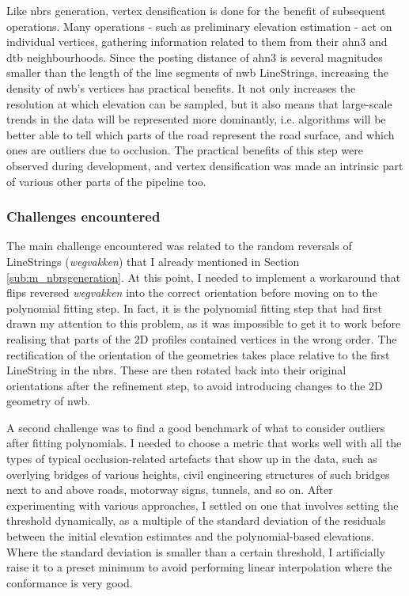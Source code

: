 Like \ac{nbrs} generation, vertex densification is done for the benefit of subsequent operations. Many operations - such as preliminary elevation estimation - act on individual vertices, gathering information related to them from their \ac{ahn3} and \ac{dtb} neighbourhoods. Since the posting distance of \ac{ahn3} is several magnitudes smaller than the length of the line segments of \ac{nwb} LineStrings, increasing the density of \ac{nwb}'s vertices has practical benefits. It not only increases the resolution at which elevation can be sampled, but it also means that large-scale trends in the data will be represented more dominantly, i.e. algorithms will be better able to tell which parts of the road represent the road surface, and which ones are outliers due to occlusion. The practical benefits of this step were observed during development, and vertex densification was made an intrinsic part of various other parts of the pipeline too.

\subsubsection{Challenges encountered}

The main challenge encountered was related to the random reversals of LineStrings (\textit{wegvakken}) that I already mentioned in Section \ref{sub:m_nbrsgeneration}. At this point, I needed to implement a workaround that flips reversed \textit{wegvakken} into the correct orientation before moving on to the polynomial fitting step. In fact, it is the polynomial fitting step that had first drawn my attention to this problem, as it was impossible to get it to work before realising that parts of the 2D profiles contained vertices in the wrong order. The rectification of the orientation of the geometries takes place relative to the first LineString in the \ac{nbrs}. These are then rotated back into their original orientations after the refinement step, to avoid introducing changes to the 2D geometry of \ac{nwb}.

A second challenge was to find a good benchmark of what to consider outliers after fitting polynomials. I needed to choose a metric that works well with all the types of typical occlusion-related artefacts that show up in the data, such as overlying bridges of various heights, civil engineering structures of such bridges next to and above roads, motorway signs, tunnels, and so on. After experimenting with various approaches, I settled on one that involves setting the threshold dynamically, as a multiple of the standard deviation of the residuals between the initial elevation estimates and the polynomial-based elevations. Where the standard deviation is smaller than a certain threshold, I artificially raise it to a preset minimum to avoid performing linear interpolation where the conformance is very good.

